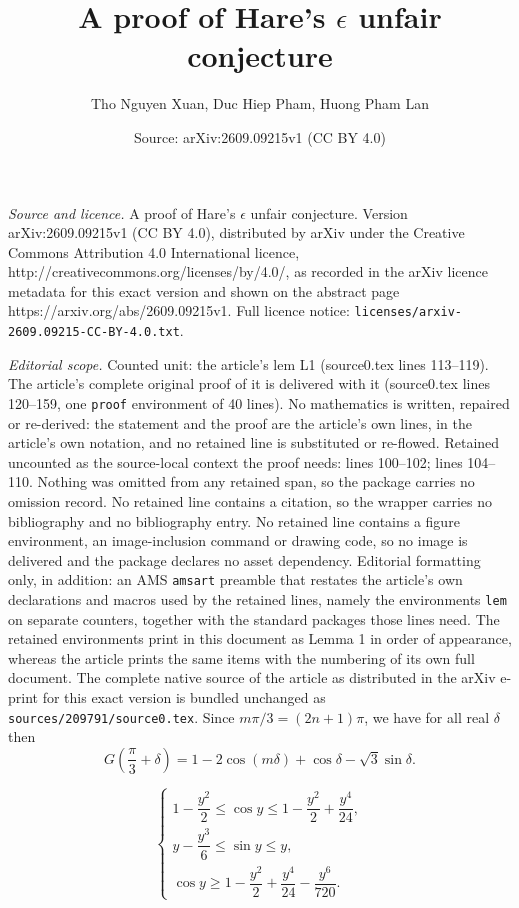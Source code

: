 \documentclass[10pt,a4paper]{amsart}
\title{A proof of Hare's $\epsilon$ unfair conjecture}
\author{Tho Nguyen Xuan, Duc Hiep Pham, Huong Pham Lan}
\date{Source: arXiv:2609.09215v1 (CC BY 4.0)}
\begin{document}
\maketitle

\noindent\emph{Source and licence.} A proof of Hare's $\epsilon$ unfair conjecture. Version arXiv:2609.09215v1 (CC BY 4.0), distributed by arXiv under the Creative Commons Attribution 4.0 International licence, http://creativecommons.org/licenses/by/4.0/, as recorded in the arXiv licence metadata for this exact version and shown on the abstract page https://arxiv.org/abs/2609.09215v1. Full licence notice: \texttt{licenses/arxiv-2609.09215-CC-BY-4.0.txt}.\par\smallskip

\noindent\textit{Editorial scope.} Counted unit: the article's lem L1 (source0.tex lines 113--119). The article's complete original proof of it is delivered with it (source0.tex lines 120--159, one \texttt{proof} environment of 40 lines). No mathematics is written, repaired or re-derived: the statement and the proof are the article's own lines, in the article's own notation, and no retained line is substituted or re-flowed.  Retained uncounted as the source-local context the proof needs: lines 100--102; lines 104--110.  Nothing was omitted from any retained span, so the package carries no omission record.  No retained line contains a citation, so the wrapper carries no bibliography and no bibliography entry.  No retained line contains a figure environment, an image-inclusion command or drawing code, so no image is delivered and the package declares no asset dependency.  Editorial formatting only, in addition: an AMS \texttt{amsart} preamble that restates the article's own declarations and macros used by the retained lines, namely the environments \texttt{lem} on separate counters, together with the standard packages those lines need.  The retained environments print in this document as Lemma 1 in order of appearance, whereas the article prints the same items with the numbering of its own full document.  The complete native source of the article as distributed in the arXiv e-print for this exact version is bundled unchanged as \texttt{sources/209791/source0.tex}.
Since $m\pi/3=(2n+1)\pi$, we have for all real $\delta$ then \begin{equation}\label{E6}
G(\dfrac{\pi}{3}+\delta)=1-2\cos(m\delta)+\cos\delta-\sqrt{3}\sin\delta.
\end{equation}

\begin{equation}\label{ineq}
\begin{cases}
1-\dfrac{y^2}{2}\leq\cos y\leq 1-\dfrac{y^2}{2}+\dfrac{y^4}{24},\\
y-\dfrac{y^3}{6}\leq \sin y\leq y,\\
\cos y\geq 1-\dfrac{y^2}{2}+\dfrac{y^4}{24}-\dfrac{y^6}{720}.
\end{cases}
\end{equation}
\end{document}
